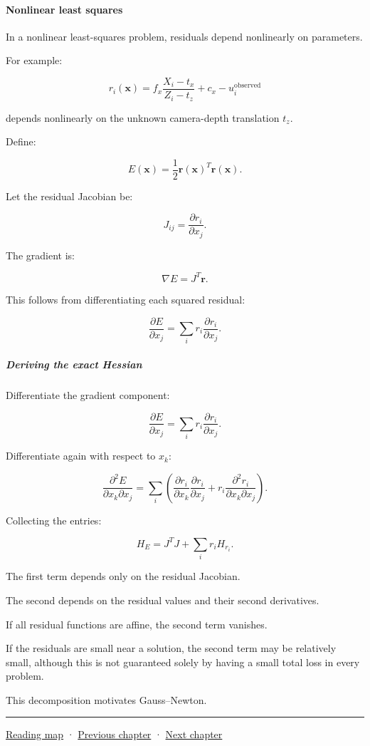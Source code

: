 \paragraph{Nonlinear least squares}\label{nonlinear-least-squares}

In a nonlinear least-squares problem, residuals depend nonlinearly on parameters.

For example:

\[
r_i(\mathbf x) = f_x\frac{X_i-t_x}{Z_i-t_z}+c_x-u_i^{\mathrm{observed}}
\]

depends nonlinearly on the unknown camera-depth translation \(t_z\).

Define:

\[
E(\mathbf x)=\frac12\mathbf r(\mathbf x)^T\mathbf r(\mathbf x).
\]

Let the residual Jacobian be:

\[
J_{ij}= \frac{\partial r_i}{\partial x_j}.
\]

The gradient is:

\[
\boxed{ \nabla E=J^T\mathbf r }.
\]

This follows from differentiating each squared residual:

\[
\frac{\partial E}{\partial x_j} = \sum_i r_i\frac{\partial r_i}{\partial x_j}.
\]

\subparagraph{Deriving the exact Hessian}\label{deriving-the-exact-hessian}

Differentiate the gradient component:

\[
\frac{\partial E}{\partial x_j} = \sum_i r_i\frac{\partial r_i}{\partial x_j}.
\]

Differentiate again with respect to \(x_k\):

\[
\frac{\partial^2E}{\partial x_k\partial x_j} = \sum_i \left( \frac{\partial r_i}{\partial x_k} \frac{\partial r_i}{\partial x_j} + r_i\frac{\partial^2r_i}{\partial x_k\partial x_j} \right).
\]

Collecting the entries:

\[
\boxed{ H_E = J^TJ+ \sum_i r_iH_{r_i} }.
\]

The first term depends only on the residual Jacobian.

The second depends on the residual values and their second derivatives.

If all residual functions are affine, the second term vanishes.

If the residuals are small near a solution, the second term may be relatively small, although this is not guaranteed solely by having a small total loss in every problem.

This decomposition motivates Gauss--Newton.

\begin{center}\rule{0.5\linewidth}{0.5pt}\end{center}

\href{Chapter\%20Edition/01\%20-\%20Computing\%20Foundations/00\%20-\%20Reading\%20Map}{Reading map} · \hyperref[02-foundations-ii-ch025]{Previous chapter} · \hyperref[02-foundations-ii-ch027]{Next chapter}
